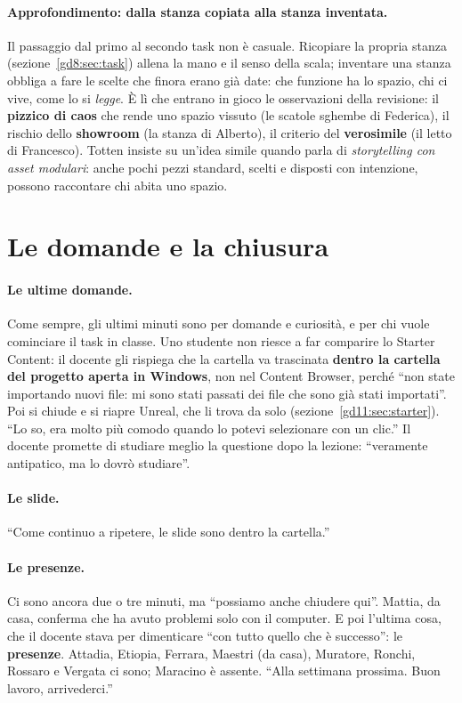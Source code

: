 \paragraph{Approfondimento: dalla stanza copiata alla stanza inventata.} Il
passaggio dal primo al secondo task non è casuale. Ricopiare la propria stanza
(sezione~\ref{gd8:sec:task}) allena la mano e il senso della scala; inventare una
stanza obbliga a fare le scelte che finora erano già date: che funzione ha lo
spazio, chi ci vive, come lo si \emph{legge}. È lì che entrano in gioco le
osservazioni della revisione: il \textbf{pizzico di caos} che rende uno spazio
vissuto (le scatole sghembe di Federica), il rischio dello \textbf{showroom}
(la stanza di Alberto), il criterio del \textbf{verosimile} (il letto di
Francesco). Totten insiste su un'idea simile quando parla di \emph{storytelling
con asset modulari}: anche pochi pezzi standard, scelti e disposti con
intenzione, possono raccontare chi abita uno spazio.

\section{Le domande e la chiusura}
\label{gd11:sec:chiusura}

\paragraph{Le ultime domande.} Come sempre, gli ultimi minuti sono per domande e
curiosità, e per chi vuole cominciare il task in classe. Uno studente non riesce a far comparire lo Starter Content: il docente gli
rispiega che la
cartella va trascinata \textbf{dentro la cartella del progetto aperta in
Windows}, non nel Content Browser, perché ``non state importando nuovi file: mi
sono stati passati dei file che sono già stati importati''. Poi si chiude e si
riapre Unreal, che li trova da solo (sezione~\ref{gd11:sec:starter}). ``Lo so,
era molto più comodo quando lo potevi selezionare con un clic.'' Il docente
promette di studiare meglio la questione dopo la lezione: ``veramente antipatico,
ma lo dovrò studiare''.

\paragraph{Le slide.} ``Come continuo a ripetere, le slide sono dentro la
cartella.''

\paragraph{Le presenze.} Ci sono ancora due o tre minuti, ma ``possiamo anche
chiudere qui''. Mattia, da casa, conferma che ha avuto problemi solo con il
computer. E poi l'ultima cosa, che il docente stava per dimenticare ``con tutto
quello che è successo'': le \textbf{presenze}. Attadia, Etiopia, Ferrara, Maestri
(da casa), Muratore, Ronchi, Rossaro e Vergata ci sono; Maracino è assente.
``Alla settimana prossima. Buon lavoro, arrivederci.''

